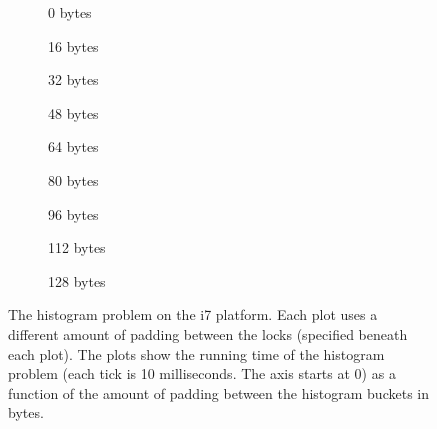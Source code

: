 \begin{figure}[hbpt]
	\graphicspath{{plots/}}
	\begin{subfigure}{0.32\textwidth}
		
		\caption{0 bytes}
	\end{subfigure}
	\begin{subfigure}{0.32\textwidth}
		
		\caption{16 bytes}
	\end{subfigure}
	\begin{subfigure}{0.32\textwidth}
		
		\caption{32 bytes}
	\end{subfigure}
	\begin{subfigure}{0.32\textwidth}
		
		\caption{48 bytes}
	\end{subfigure}
	\begin{subfigure}{0.32\textwidth}
		
		\caption{64 bytes}
	\end{subfigure}
	\begin{subfigure}{0.32\textwidth}
		
		\caption{80 bytes}
	\end{subfigure}
	\begin{subfigure}{0.32\textwidth}
		
		\caption{96 bytes}
	\end{subfigure}
	\begin{subfigure}{0.32\textwidth}
		
		\caption{112 bytes}
	\end{subfigure}
	\begin{subfigure}{0.32\textwidth}
		
		\caption{128 bytes}
	\end{subfigure}
	\caption{The histogram problem on the i7 platform. Each plot uses a
	different amount of padding between the locks (specified beneath each
	plot). The plots show the running time of the histogram problem (each
	tick is 10 milliseconds. The axis starts at 0) as a function of the amount of padding between
	the histogram buckets in bytes.}
\end{figure}

